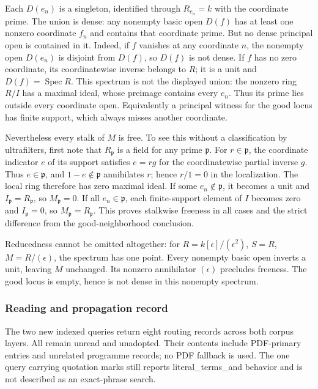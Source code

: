 Each \(D(e_n)\) is a singleton, identified through \(R_{e_n}=k\) with the coordinate prime. The union is dense: any nonempty basic open \(D(f)\) has at least one nonzero coordinate \(f_n\) and contains that coordinate prime. But no dense principal open is contained in it. Indeed, if \(f\) vanishes at any coordinate \(n\), the nonempty open \(D(e_n)\) is disjoint from \(D(f)\), so \(D(f)\) is not dense. If \(f\) has no zero coordinate, its coordinatewise inverse belongs to \(R\); it is a unit and \(D(f)=\operatorname{Spec}R\). This spectrum is not the displayed union: the nonzero ring \(R/I\) has a maximal ideal, whose preimage contains every \(e_n\). Thus its prime lies outside every coordinate open. Equivalently a principal witness for the good locus has finite support, which always misses another coordinate.

Nevertheless every stalk of \(M\) is free. To see this without a classification by ultrafilters, first note that \(R_{\mathfrak p}\) is a field for any prime \(\mathfrak p\). For \(r\in\mathfrak p\), the coordinate indicator \(e\) of its support satisfies \(e=rg\) for the coordinatewise partial inverse \(g\). Thus \(e\in\mathfrak p\), and \(1-e\notin\mathfrak p\) annihilates \(r\); hence \(r/1=0\) in the localization. The local ring therefore has zero maximal ideal. If some \(e_n\notin\mathfrak p\), it becomes a unit and \(I_{\mathfrak p}=R_{\mathfrak p}\), so \(M_{\mathfrak p}=0\). If all \(e_n\in\mathfrak p\), each finite-support element of \(I\) becomes zero and \(I_{\mathfrak p}=0\), so \(M_{\mathfrak p}=R_{\mathfrak p}\). This proves stalkwise freeness in all cases and the strict difference from the good-neighborhood conclusion.

Reducedness cannot be omitted altogether: for \(R=k[\epsilon]/(\epsilon^2)\), \(S=R\), \(M=R/(\epsilon)\), the spectrum has one point. Every nonempty basic open inverts a unit, leaving \(M\) unchanged. Its nonzero annihilator \((\epsilon)\) precludes freeness. The good locus is empty, hence is not dense in this nonempty spectrum.

\subsubsection{Reading and propagation record}\label{algebra-proof-027-reading-and-propagation-record}

The two new indexed queries return eight routing records across both corpus layers. All remain unread and unadopted. Their contents include PDF-primary entries and unrelated programme records; no PDF fallback is used. The one query carrying quotation marks still reports literal\_terms\_and behavior and is not described as an exact-phrase search.

